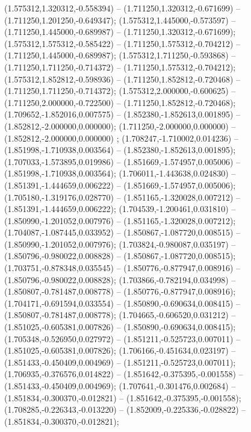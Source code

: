  (1.575312,1.320312,-0.558394) -- (1.711250,1.320312,-0.671699) -- (1.711250,1.201250,-0.649347);
 (1.575312,1.445000,-0.573597) -- (1.711250,1.445000,-0.689987) -- (1.711250,1.320312,-0.671699);
 (1.575312,1.575312,-0.585422) -- (1.711250,1.575312,-0.704212) -- (1.711250,1.445000,-0.689987);
 (1.575312,1.711250,-0.593868) -- (1.711250,1.711250,-0.714372) -- (1.711250,1.575312,-0.704212);
 (1.575312,1.852812,-0.598936) -- (1.711250,1.852812,-0.720468) -- (1.711250,1.711250,-0.714372);
 (1.575312,2.000000,-0.600625) -- (1.711250,2.000000,-0.722500) -- (1.711250,1.852812,-0.720468);
 (1.709652,-1.852016,0.007575) -- (1.852380,-1.852613,0.001895) -- (1.852812,-2.000000,0.000000);
 (1.711250,-2.000000,0.000000) -- (1.852812,-2.000000,0.000000) ;
 (1.708247,-1.710002,0.014236) -- (1.851998,-1.710938,0.003564) -- (1.852380,-1.852613,0.001895);
 (1.707033,-1.573895,0.019986) -- (1.851669,-1.574957,0.005006) -- (1.851998,-1.710938,0.003564);
 (1.706011,-1.443638,0.024830) -- (1.851391,-1.444659,0.006222) -- (1.851669,-1.574957,0.005006);
 (1.705180,-1.319176,0.028770) -- (1.851165,-1.320028,0.007212) -- (1.851391,-1.444659,0.006222);
 (1.704539,-1.200461,0.031810) -- (1.850990,-1.201052,0.007976) -- (1.851165,-1.320028,0.007212);
 (1.704087,-1.087445,0.033952) -- (1.850867,-1.087720,0.008515) -- (1.850990,-1.201052,0.007976);
 (1.703824,-0.980087,0.035197) -- (1.850796,-0.980022,0.008828) -- (1.850867,-1.087720,0.008515);
 (1.703751,-0.878348,0.035545) -- (1.850776,-0.877947,0.008916) -- (1.850796,-0.980022,0.008828);
 (1.703866,-0.782194,0.034998) -- (1.850807,-0.781487,0.008778) -- (1.850776,-0.877947,0.008916);
 (1.704171,-0.691594,0.033554) -- (1.850890,-0.690634,0.008415) -- (1.850807,-0.781487,0.008778);
 (1.704665,-0.606520,0.031212) -- (1.851025,-0.605381,0.007826) -- (1.850890,-0.690634,0.008415);
 (1.705348,-0.526950,0.027972) -- (1.851211,-0.525723,0.007011) -- (1.851025,-0.605381,0.007826);
 (1.706166,-0.451634,0.023197) -- (1.851433,-0.450409,0.004969) -- (1.851211,-0.525723,0.007011);
 (1.706935,-0.376576,0.014822) -- (1.851642,-0.375395,-0.001558) -- (1.851433,-0.450409,0.004969);
 (1.707641,-0.301476,0.002684) -- (1.851834,-0.300370,-0.012821) -- (1.851642,-0.375395,-0.001558);
 (1.708285,-0.226343,-0.013220) -- (1.852009,-0.225336,-0.028822) -- (1.851834,-0.300370,-0.012821);
